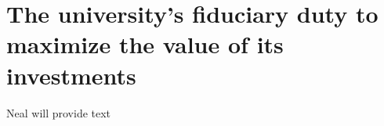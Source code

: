 
		\section{The university's fiduciary duty to maximize the value of its investments}

\textsf{Neal will provide text}

